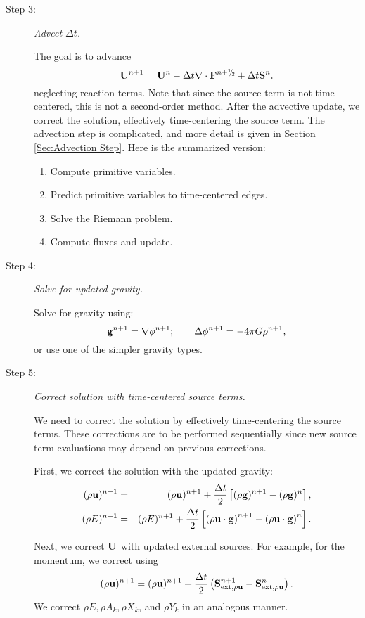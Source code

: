 \begin{description}
\item[Step 3:] {\em Advect $\Delta t$.}

The goal is to advance
\begin{equation}
\Ub^{n+1} = \Ub^n - \dt\nabla\cdot\Fb^\nph + \dt\Sb^n.
\end{equation}
neglecting reaction terms.  Note that since the source term is not
time centered, this is not a second-order method.  After the advective
update, we correct the solution, effectively time-centering the source
term. The advection step is complicated, and more detail is given in
Section \ref{Sec:Advection Step}.  Here is the summarized version:
\begin{enumerate}
\item Compute primitive variables.
\item Predict primitive variables to time-centered edges.
\item Solve the Riemann problem.
\item Compute fluxes and update.
\end{enumerate}
\item[Step 4:] {\em Solve for updated gravity.}

Solve for gravity using:
\begin{equation}
{\bf g}^{n+1} = \nabla\phi^{n+1}; \qquad \Delta\phi^{n+1} = -4\pi G\rho^{n+1},
\end{equation}
or use one of the simpler gravity types.
\item[Step 5:] {\em Correct solution with time-centered source terms.}

We need to correct the solution by effectively time-centering the
source terms.  These corrections are to be performed sequentially
since new source term evaluations may depend on previous corrections.

First, we correct the solution with the updated gravity:
\begin{eqnarray}
(\rho{\bf u})^{n+1} &=& (\rho{\bf u})^{n+1} + \frac{\Delta t}{2}\left[(\rho{\bf g})^{n+1} - (\rho{\bf g})^n\right], \\
(\rho E)^{n+1} &=& (\rho E)^{n+1} + \frac{\Delta t}{2}\left[\left(\rho{\bf u}\cdot{\bf g}\right)^{n+1} - \left(\rho{\bf u}\cdot{\bf g}\right)^n\right].
\end{eqnarray}

Next, we correct ${\bf U}$ with updated external sources.  For example,
for the momentum, we correct using
\begin{equation}
(\rho{\bf u})^{n+1} = (\rho{\bf u})^{n+1} + \frac{\Delta t}{2}\left({\bf S}_{{\rm ext},\rho{\bf u}}^{n+1} - {\bf S}_{{\rm ext},\rho{\bf u}}^n\right).
\end{equation}
We correct $\rho E, \rho A_k, \rho X_k$, and $\rho Y_k$ in an
analogous manner.


\end{description}
